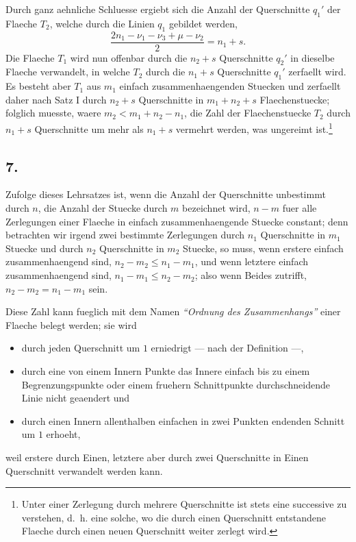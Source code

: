 \documentclass[11pt,a4paper]{article}
\theoremstyle{plain}
\theoremstyle{definition}
\begin{document}
Durch ganz aehnliche Schluesse ergiebt sich die Anzahl der Querschnitte $q_1'$ der Flaeche $T_2$, welche durch die Linien $q_1$ gebildet werden,
\[
\frac{2n_1 - \nu_1 - \nu_3 + \mu - \nu_2}{2} = n_1 + s.
\]
Die Flaeche $T_1$ wird nun offenbar durch die $n_2 + s$ Querschnitte $q_2'$ in dieselbe Flaeche verwandelt, in welche $T_2$ durch die $n_1 + s$ Querschnitte $q_1'$ zerfaellt wird. Es besteht aber $T_1$ aus $m_1$ einfach zusammenhaengenden Stuecken und zerfaellt daher nach Satz I durch $n_2 + s$ Querschnitte in $m_1 + n_2 + s$ Flaechenstuecke; folglich muesste, waere $m_2 < m_1 + n_2 - n_1$, die Zahl der Flaechenstuecke $T_2$ durch $n_1 + s$ Querschnitte um mehr als $n_1 + s$ vermehrt werden, was ungereimt ist.\footnote{Unter einer Zerlegung durch mehrere Querschnitte ist stets eine successive zu verstehen, d.\ h. eine solche, wo die durch einen Querschnitt entstandene Flaeche durch einen neuen Querschnitt weiter zerlegt wird.}

\subsection*{7.}

Zufolge dieses Lehrsatzes ist, wenn die Anzahl der Querschnitte unbestimmt durch $n$, die Anzahl der Stuecke durch $m$ bezeichnet wird, $n - m$ fuer alle Zerlegungen einer Flaeche in einfach zusammenhaengende Stuecke constant; denn betrachten wir irgend zwei bestimmte Zerlegungen durch $n_1$ Querschnitte in $m_1$ Stuecke und durch $n_2$ Querschnitte in $m_2$ Stuecke, so muss, wenn erstere einfach zusammenhaengend sind, $n_2 - m_2 \leq n_1 - m_1$, und wenn letztere einfach zusammenhaengend sind, $n_1 - m_1 \leq n_2 - m_2$; also wenn Beides zutrifft, $n_2 - m_2 = n_1 - m_1$ sein.

Diese Zahl kann fueglich mit dem Namen \emph{``Ordnung des Zusammenhangs''} einer Flaeche belegt werden; sie wird
\begin{itemize}[nosep]
\item durch jeden Querschnitt um $1$ erniedrigt --- nach der Definition ---,
\item durch eine von einem Innern Punkte das Innere einfach bis zu einem Begrenzungspunkte oder einem fruehern Schnittpunkte durchschneidende Linie nicht geaendert und
\item durch einen Innern allenthalben einfachen in zwei Punkten endenden Schnitt um $1$ erhoeht,
\end{itemize}
weil erstere durch Einen, letztere aber durch zwei Querschnitte in Einen Querschnitt verwandelt werden kann.
\end{document}
